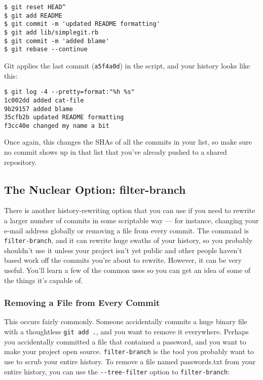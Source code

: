 \documentclass[a4paper]{book}
\newcounter{tab}[chapter]
\begin{document}
\begin{shaded}\begin{verbatim}
$ git reset HEAD^
$ git add README
$ git commit -m 'updated README formatting'
$ git add lib/simplegit.rb
$ git commit -m 'added blame'
$ git rebase --continue
\end{verbatim}\end{shaded}

Git applies the last commit (\texttt{a5f4a0d}) in the script, and your history looks like this:

\begin{shaded}\begin{verbatim}
$ git log -4 --pretty=format:"%h %s"
1c002dd added cat-file
9b29157 added blame
35cfb2b updated README formatting
f3cc40e changed my name a bit
\end{verbatim}\end{shaded}

Once again, this changes the SHAs of all the commits in your list, so make sure no commit shows up in that list that you've already pushed to a shared repository.

\subsection{The Nuclear Option: filter-branch}\label{the-nuclear-option-filter-branch}

There is another history-rewriting option that you can use if you need to rewrite a larger number of commits in some scriptable way --- for instance, changing your e-mail address globally or removing a file from every commit. The command is \texttt{filter-branch}, and it can rewrite huge swaths of your history, so you probably shouldn't use it unless your project isn't yet public and other people haven't based work off the commits you're about to rewrite. However, it can be very useful. You'll learn a few of the common uses so you can get an idea of some of the things it's capable of.

\subsubsection{Removing a File from Every Commit}

This occurs fairly commonly. Someone accidentally commits a huge binary file with a thoughtless \texttt{git add .}, and you want to remove it everywhere. Perhaps you accidentally committed a file that contained a password, and you want to make your project open source. \texttt{filter-branch} is the tool you probably want to use to scrub your entire history. To remove a file named passwords.txt from your entire history, you can use the \texttt{-{}-tree-filter} option to \texttt{filter-branch}:
\end{document}
